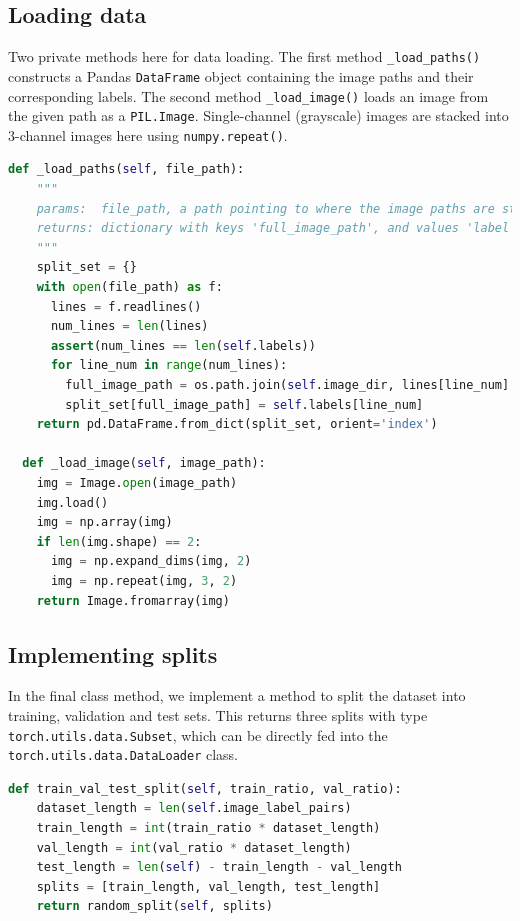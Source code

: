 \documentclass[twocolumn,9pt]{article}
\begin{document}
\subsection*{Loading data}
Two private methods here for data loading. The first method \lstinline{_load_paths()} constructs
a Pandas \lstinline{DataFrame} object containing the image paths and their corresponding labels.
The second method \lstinline{_load_image()} loads an image from the given path as a \lstinline{PIL.Image}.
Single-channel (grayscale) images are stacked into 3-channel images here using \lstinline{numpy.repeat()}.
\begin{lstlisting}[language=Python]   
  def _load_paths(self, file_path):
    """
    params:  file_path, a path pointing to where the image paths are stored.
    returns: dictionary with keys 'full_image_path', and values 'label'
    """
    split_set = {}
    with open(file_path) as f:
      lines = f.readlines()
      num_lines = len(lines)
      assert(num_lines == len(self.labels))
      for line_num in range(num_lines):
        full_image_path = os.path.join(self.image_dir, lines[line_num].strip('\n'))
        split_set[full_image_path] = self.labels[line_num]
    return pd.DataFrame.from_dict(split_set, orient='index')

  def _load_image(self, image_path):
    img = Image.open(image_path)
    img.load()
    img = np.array(img)
    if len(img.shape) == 2:
      img = np.expand_dims(img, 2)
      img = np.repeat(img, 3, 2)
    return Image.fromarray(img)
\end{lstlisting}

\subsection*{Implementing splits}
In the final class method, we implement a method to split the dataset into
training, validation and test sets. This returns three splits with type
\lstinline{torch.utils.data.Subset}, which can be directly fed into the
\lstinline{torch.utils.data.DataLoader} class.
\begin{lstlisting}[language=Python]
  def train_val_test_split(self, train_ratio, val_ratio):
    dataset_length = len(self.image_label_pairs)
    train_length = int(train_ratio * dataset_length)
    val_length = int(val_ratio * dataset_length)
    test_length = len(self) - train_length - val_length
    splits = [train_length, val_length, test_length]
    return random_split(self, splits)
\end{lstlisting}
\end{document}
